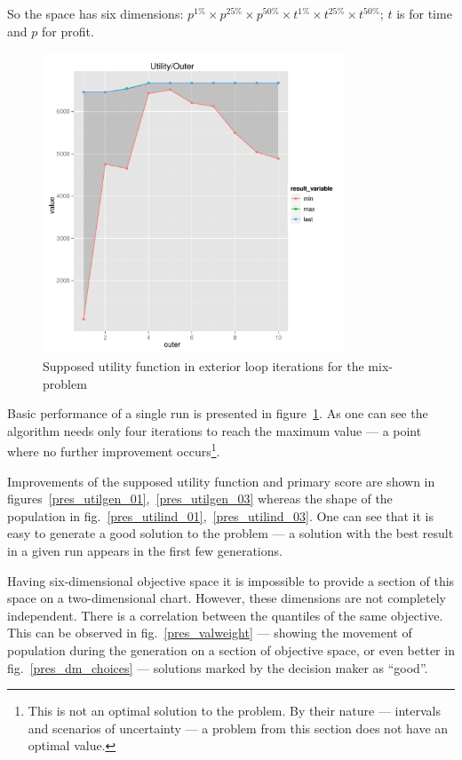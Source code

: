 So the space has six dimensions: $p^{1\%} \times p^{25\%} \times p^{50\%}
\times t^{1\%} \times t^{25\%} \times t^{50\%}$; $t$ is for time and $p$ for
profit.

\begin{figure}
  \centering
  \includegraphics[width=0.8\textwidth]{exp/uncert/pres_utilouter}
  \caption{Supposed utility function in exterior loop iterations for the
    mix-problem}
  \label{pres_utilouter}
\end{figure}

Basic performance of a single run is presented in
figure~\ref{pres_utilouter}. As one can see the algorithm needs only four
iterations to reach the maximum value --- a point where no further improvement
occurs\footnote{This is not an optimal solution to the problem. By their
  nature --- intervals and scenarios of uncertainty --- a problem from this
  section does not have an optimal value.}.

Improvements of the supposed utility function and primary score are shown in
figures~\ref{pres_utilgen_01},~\ref{pres_utilgen_03} whereas the shape of the
population in fig.~\ref{pres_utilind_01},~\ref{pres_utilind_03}. One can see
that it is easy to generate a good solution to the problem --- a solution with
the best result in a given run appears in the first few generations.

Having six-dimensional objective space it is impossible to provide a section
of this space on a two-dimensional chart. However, these dimensions are not
completely independent. There is a correlation between the quantiles of the
same objective. This can be observed in fig.~\ref{pres_valweight} --- showing
the movement of population during the generation on a section of objective
space, or even better in fig.~\ref{pres_dm_choices} --- solutions marked by the
decision maker as ``good''.

